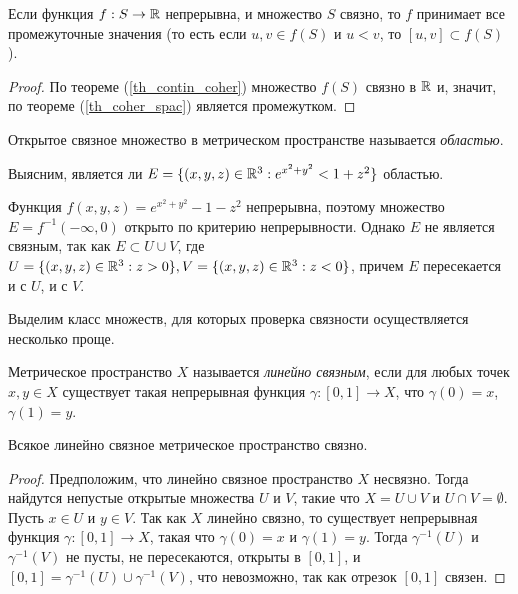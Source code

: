 \begin{corollary}
    Если функция $f: S \to \mathbb{R}$ непрерывна, и множество $S$ связно, то $f$ принимает все промежуточные значения (то есть если $u, v \in f(S)$ и $u < v$, то $[u, v] \subset f(S)$).
\end{corollary}

\begin{proof}
    По теореме (\ref{th_contin_coher}) множество $f(S)$ связно в $\mathbb{R}$ и, значит, по теореме (\ref{th_coher_spac}) является промежутком.
\end{proof}

\begin{definition}
    Открытое связное множество в метрическом пространстве называется \textit{областью}.
\end{definition}

\begin{example}
    Выясним, является ли $E = \{(x, y, z) \in \mathbb{R}^{3}: e^{x^{2} + y^{2}} < 1 + z^{2}\}$ областью.
\end{example}

\begin{solution}
    Функция $f(x, y, z) = e^{x^{2} + y^{2}} - 1 - z^{2}$ непрерывна, поэтому множество $E = f^{-1}(-\infty, 0)$ открыто по критерию непрерывности. Однако $E$ не является связным, так как $E \subset U \cup V$, где $U = \{(x, y, z) \in \mathbb{R}^{3}: z > 0\}, V = \{(x, y, z) \in \mathbb{R}^{3}: z < 0\}$, причем $E$ пересекается и с $U$, и с $V$.
\end{solution}

Выделим класс множеств, для которых проверка связности осуществляется несколько проще.

\begin{definition}
    Метрическое пространство $X$ называется \textit{линейно связным}, если для любых точек $x, y \in X$ существует такая непрерывная функция $\gamma: [0, 1] \to X$, что $\gamma(0) = x$, $\gamma(1) = y$.
\end{definition}

\begin{theorem}
    Всякое линейно связное метрическое пространство связно.
\end{theorem}

\begin{proof}
    Предположим, что линейно связное пространство $X$ несвязно. Тогда найдутся непустые открытые множества $U$ и $V$, такие что $X = U \cup V$ и $U \cap V = \emptyset$. Пусть $x \in U$ и $y \in V$. Так как $X$ линейно связно, то существует непрерывная функция $\gamma: [0, 1] \to X$, такая что $\gamma(0) = x$ и $\gamma(1) = y$. Тогда $\gamma^{-1}(U)$ и $\gamma^{-1}(V)$ не пусты, не пересекаются, открыты в $[0, 1]$, и $[0, 1] = \gamma^{-1}(U) \cup \gamma^{-1}(V)$, что невозможно, так как отрезок $[0, 1]$ связен.
\end{proof}

